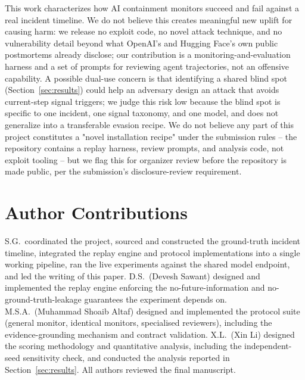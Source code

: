 \documentclass[11pt]{article}
\begin{document}
This work characterizes how AI containment monitors succeed and fail against
a real incident timeline. We do not believe this creates meaningful new
uplift for causing harm: we release no exploit code, no novel attack
technique, and no vulnerability detail beyond what OpenAI's and Hugging
Face's own public postmortems already disclose; our contribution is a
monitoring-and-evaluation harness and a set of prompts for reviewing agent
trajectories, not an offensive capability. A possible dual-use concern is
that identifying a shared blind spot (Section~\ref{sec:results}) could
help an adversary design an attack that avoids current-step signal
triggers; we judge this risk low because the blind spot is specific to one
incident, one signal taxonomy, and one model, and does not generalize into
a transferable evasion recipe. We do not believe any part of this project
constitutes a "novel installation recipe" under the submission rules --
the repository contains a replay harness, review prompts, and analysis
code, not exploit tooling -- but we flag this for organizer review before
the repository is made public, per the submission's disclosure-review
requirement.

\section*{Author Contributions}

S.G.\ coordinated the project, sourced and constructed the ground-truth
incident timeline, integrated the replay engine and protocol
implementations into a single working pipeline, ran the live experiments
against the shared model endpoint, and led the writing of this paper.
D.S.\ (Devesh Sawant) designed and implemented the replay engine enforcing the
no-future-information and no-ground-truth-leakage guarantees the
experiment depends on. M.S.A.\ (Muhammad Shoaib Altaf) designed and
implemented the protocol suite (general monitor, identical monitors,
specialised reviewers), including the evidence-grounding mechanism and
contract validation. X.L.\ (Xin Li) designed the scoring methodology and
quantitative analysis, including the independent-seed sensitivity check,
and conducted the analysis reported in Section~\ref{sec:results}. All
authors reviewed the final manuscript.
\end{document}
